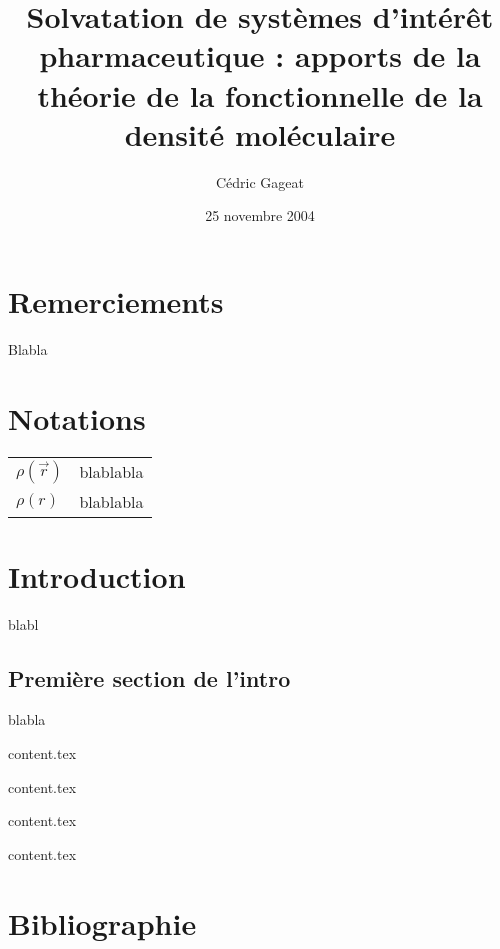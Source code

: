 \documentclass{bredele}
\title{Solvatation de systèmes d’intérêt pharmaceutique : apports de la théorie de la fonctionnelle de la densité moléculaire}
\author{Cédric Gageat}
\date{25 novembre 2004}
\begin{document}
\maketitle


\clearemptydoublepage
\chapter*{Remerciements}
\thispagestyle{empty}
Blabla


\clearemptydoublepage
\chapter*{Notations}
\thispagestyle{empty}
\begin{tabular}{ll}
$\rho(\vec{r})$ & blablabla \\
$\rho(r)$ & blablabla 
\end{tabular}




\clearemptydoublepage
\frontmatter


\clearemptydoublepage
\chapter*{Introduction}
blabl


\section*{Première section de l'intro}

blabla


\clearemptydoublepage
{}

\clearemptydoublepage
\mainmatter %




\clearemptydoublepage
{content.tex}

\clearemptydoublepage
{content.tex}

\clearemptydoublepage
{content.tex}

\clearemptydoublepage
{content.tex}



\clearemptydoublepage
\backmatter
\clearemptydoublepage
\chapter*{Bibliographie}

\newpage
\clearemptydoublepage
\tableofcontents
\end{document}
